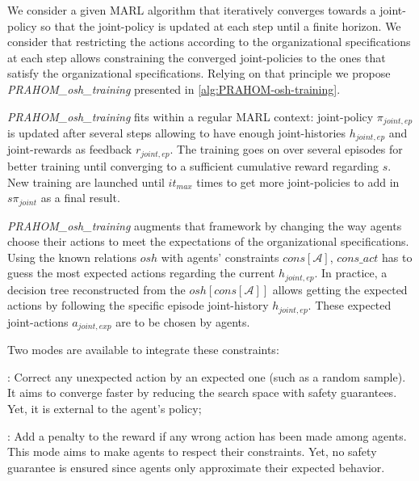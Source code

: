\documentclass[runningheads]{llncs}
\newcounter{relation}
\newcounter{proof}
\begin{document}



\noindent We consider a given MARL algorithm that iteratively converges towards a joint-policy so that the joint-policy is updated at each step until a finite horizon.
We consider that restricting the actions according to the organizational specifications at each step allows constraining the converged joint-policies to the ones that satisfy the organizational specifications\footnotemark[1]. Relying on that principle we propose \emph{PRAHOM\_osh\_training} presented in \autoref{alg:PRAHOM-osh-training}.

\emph{PRAHOM\_osh\_training} fits within a regular MARL context: joint-policy $\pi_{joint,ep}$ is updated after several steps allowing to have enough joint-histories $h_{joint,ep}$ and joint-rewards as feedback $r_{joint,ep}$. The training goes on over several episodes for better training until converging to a sufficient cumulative reward regarding $s$. New training are launched until $it_{max}$ times to get more joint-policies to add in $s\pi_{joint}$ as a final result.

\emph{PRAHOM\_osh\_training} augments that framework by changing the way agents choose their actions to meet the expectations of the organizational specifications. Using the known relations $osh$ with agents' constraints $cons[\mathcal{A}]$, $cons\_act$ has to guess the most expected actions regarding the current $h_{joint,ep}$. In practice, a decision tree reconstructed from the $osh[cons[\mathcal{A}]]$ allows getting the expected actions by following the specific episode joint-history $h_{joint,ep}$. These expected joint-actions $a_{joint,exp}$ are to be chosen by agents.

Two modes are available to integrate these constraints:
%
\begin{enumerate*}[label=\roman*),itemjoin={;\quad}]
    \item {}: Correct any unexpected action by an expected one (such as a random sample). It aims to converge faster by reducing the search space with safety guarantees. Yet, it is external to the agent's policy;
    \item {}: Add a penalty to the reward if any wrong action has been made among agents. This mode aims to make agents  to respect their constraints. Yet, no safety guarantee is ensured since agents only approximate their expected behavior.
\end{enumerate*}
\end{document}
